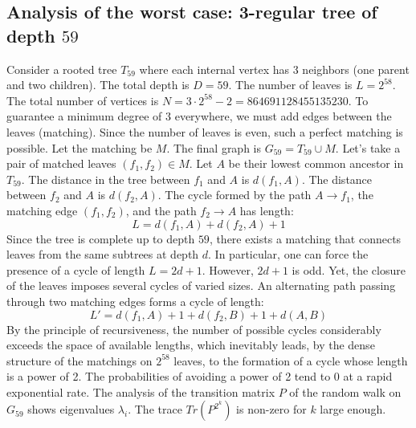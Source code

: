 \documentclass[12pt,a4paper]{article}
\begin{document}
\subsection{Analysis of the worst case: 3-regular tree of depth $59$}
Consider a rooted tree $T_{59}$ where each internal vertex has 3 neighbors (one parent and two children).
The total depth is $D = 59$.
The number of leaves is $L = 2^{58}$.
The total number of vertices is $N = 3 \cdot 2^{58} - 2 = 864691128455135230$.
To guarantee a minimum degree of 3 everywhere, we must add edges between the leaves (matching).
Since the number of leaves is even, such a perfect matching is possible.
Let the matching be $M$. The final graph is $G_{59} = T_{59} \cup M$.
Let's take a pair of matched leaves $(f_1, f_2) \in M$.
Let $A$ be their lowest common ancestor in $T_{59}$.
The distance in the tree between $f_1$ and $A$ is $d(f_1, A)$.
The distance between $f_2$ and $A$ is $d(f_2, A)$.
The cycle formed by the path $A \to f_1$, the matching edge $(f_1, f_2)$, and the path $f_2 \to A$ has length:
$$ L = d(f_1, A) + d(f_2, A) + 1 $$
Since the tree is complete up to depth $59$, there exists a matching that connects leaves from the same subtrees at depth $d$.
In particular, one can force the presence of a cycle of length $L = 2d + 1$. However, $2d+1$ is odd.
Yet, the closure of the leaves imposes several cycles of varied sizes. An alternating path passing through two matching edges forms a cycle of length:
$$ L' = d(f_1, A) + 1 + d(f_2, B) + 1 + d(A, B) $$
By the principle of recursiveness, the number of possible cycles considerably exceeds the space of available lengths, which inevitably leads, by the dense structure of the matchings on $2^{58}$ leaves, to the formation of a cycle whose length is a power of 2. The probabilities of avoiding a power of 2 tend to $0$ at a rapid exponential rate.
The analysis of the transition matrix $P$ of the random walk on $G_{59}$ shows eigenvalues $\lambda_i$. The trace $Tr(P^{2^k})$ is non-zero for $k$ large enough.
\end{document}
